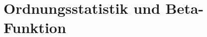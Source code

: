 %
%
%
\section{Ordnungsstatistik und Beta-Funktion
\label{dreieck:section:ordnungsstatistik}}
\rhead{}



